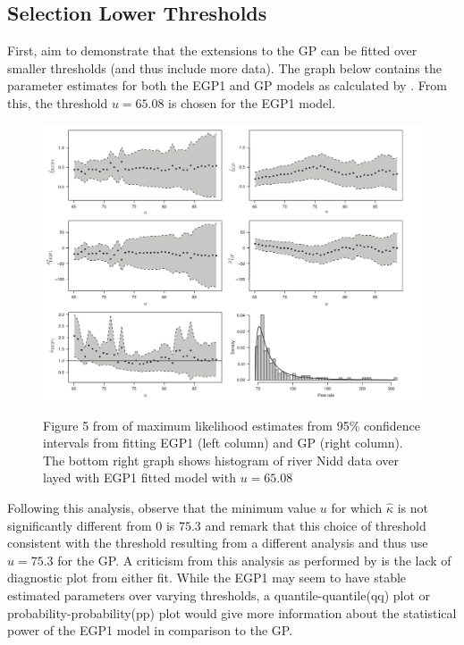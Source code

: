 \documentclass[12pt]{article}
\theoremstyle{definition}
\theoremstyle{definition}
\begin{document}
\subsection{Selection Lower Thresholds}
First, \cite{papatawn} aim to demonstrate that the extensions to the GP can be fitted over smaller thresholds (and thus include more data). The graph below contains the parameter estimates for both the EGP1 and GP models as calculated by \cite{papatawn}. From this, the threshold $u=65.08$ is chosen for the EGP1 model.
\begin{figure}[H]
\begin{center}
{\includegraphics[width=5.0in]{project/papafiles/fig5 papa.png}}
\caption{Figure 5 from \cite{papatawn} of maximum likelihood estimates from 95\% confidence intervals from fitting EGP1 (left column) and GP (right column). The bottom right graph shows histogram of river Nidd data over layed with EGP1 fitted model with $u=65.08$ }
\end{center}
\end{figure}
Following this analysis, \cite{papatawn} observe that the minimum value $u$ for which $\hat\kappa$ is not significantly different from 0 is $75.3$ and remark that this choice of threshold consistent with the threshold resulting from a different analysis \cite{fig5} and thus use $u=75.3$ for the GP. A criticism from this analysis as performed by \cite{papatawn} is the lack of diagnostic plot from either fit. While the EGP1 may seem to have stable estimated parameters over varying thresholds, a quantile-quantile(qq) plot or probability-probability(pp) plot would give more information about the statistical power of the EGP1 model in comparison to the GP.
\end{document}
